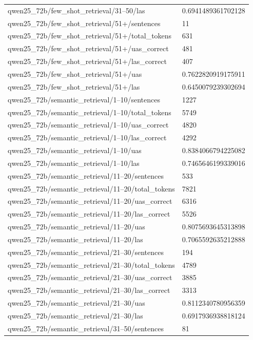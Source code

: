 \begin{tabular}{ll}
qwen25\_72b/few\_shot\_retrieval/31–50/las & 0.6941489361702128 \\
qwen25\_72b/few\_shot\_retrieval/51+/sentences & 11 \\
qwen25\_72b/few\_shot\_retrieval/51+/total\_tokens & 631 \\
qwen25\_72b/few\_shot\_retrieval/51+/uas\_correct & 481 \\
qwen25\_72b/few\_shot\_retrieval/51+/las\_correct & 407 \\
qwen25\_72b/few\_shot\_retrieval/51+/uas & 0.7622820919175911 \\
qwen25\_72b/few\_shot\_retrieval/51+/las & 0.6450079239302694 \\
qwen25\_72b/semantic\_retrieval/1–10/sentences & 1227 \\
qwen25\_72b/semantic\_retrieval/1–10/total\_tokens & 5749 \\
qwen25\_72b/semantic\_retrieval/1–10/uas\_correct & 4820 \\
qwen25\_72b/semantic\_retrieval/1–10/las\_correct & 4292 \\
qwen25\_72b/semantic\_retrieval/1–10/uas & 0.8384066794225082 \\
qwen25\_72b/semantic\_retrieval/1–10/las & 0.7465646199339016 \\
qwen25\_72b/semantic\_retrieval/11–20/sentences & 533 \\
qwen25\_72b/semantic\_retrieval/11–20/total\_tokens & 7821 \\
qwen25\_72b/semantic\_retrieval/11–20/uas\_correct & 6316 \\
qwen25\_72b/semantic\_retrieval/11–20/las\_correct & 5526 \\
qwen25\_72b/semantic\_retrieval/11–20/uas & 0.8075693645313898 \\
qwen25\_72b/semantic\_retrieval/11–20/las & 0.7065592635212888 \\
qwen25\_72b/semantic\_retrieval/21–30/sentences & 194 \\
qwen25\_72b/semantic\_retrieval/21–30/total\_tokens & 4789 \\
qwen25\_72b/semantic\_retrieval/21–30/uas\_correct & 3885 \\
qwen25\_72b/semantic\_retrieval/21–30/las\_correct & 3313 \\
qwen25\_72b/semantic\_retrieval/21–30/uas & 0.8112340780956359 \\
qwen25\_72b/semantic\_retrieval/21–30/las & 0.6917936938818124 \\
qwen25\_72b/semantic\_retrieval/31–50/sentences & 81 \\

\end{tabular}

